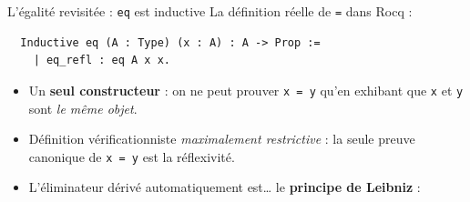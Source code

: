 \documentclass[aspectratio=169]{beamer}
\begin{document}
\begin{frame}[fragile]{L'égalité revisitée : \texttt{eq} est inductive}
  La définition réelle de \texttt{=} dans Rocq :
  \medskip
\begin{verbatim}
  Inductive eq (A : Type) (x : A) : A -> Prop :=
    | eq_refl : eq A x x.
\end{verbatim}
  \medskip
  \begin{itemize}
    \item Un \textbf{seul constructeur} : on ne peut prouver \texttt{x = y} qu'en
      exhibant que \texttt{x} et \texttt{y} sont \emph{le même objet}.
      \pause
    \item Définition vérificationniste \emph{maximalement restrictive} : la seule
      preuve canonique de \texttt{x = y} est la réflexivité.
      \pause
    \item L'éliminateur dérivé automatiquement est\ldots{} le \textbf{principe de Leibniz} :
      \begin{center}
      \end{center}
  \end{itemize}
\end{frame}
\end{document}
